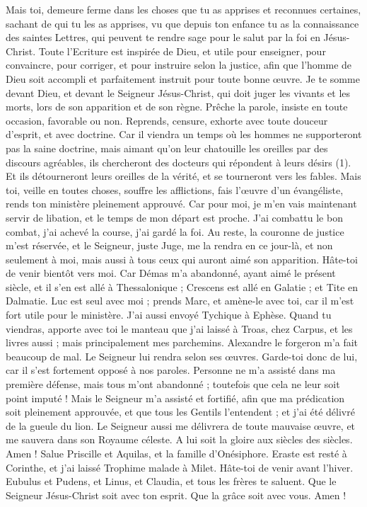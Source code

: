 \begin{multicols}{2}
Mais toi, demeure ferme dans les choses que tu as apprises et reconnues certaines, sachant de qui tu les as apprises,
vu que depuis ton enfance tu as la connaissance des saintes Lettres, qui peuvent te rendre sage pour le salut par la foi en Jésus-Christ.
Toute l'Ecriture est inspirée de Dieu, et utile pour enseigner, pour convaincre, pour corriger, et pour instruire selon la justice,
afin que l'homme de Dieu soit accompli et parfaitement instruit pour toute bonne œuvre.
\VerseOne{}Je te somme devant Dieu, et devant le Seigneur Jésus-Christ, qui doit juger les vivants et les morts, lors de son apparition et de son règne.
Prêche la parole, insiste en toute occasion, favorable ou non. Reprends, censure, exhorte avec toute douceur d'esprit, et avec doctrine.
Car il viendra un temps où les hommes ne supporteront pas la saine doctrine, mais aimant qu'on leur chatouille les oreilles par des discours agréables, ils chercheront des docteurs qui répondent à leurs désirs (1).
Et ils détourneront leurs oreilles de la vérité, et se tourneront vers les fables.
Mais toi, veille en toutes choses, souffre les afflictions, fais l'œuvre d'un évangéliste, rends ton ministère pleinement approuvé.
Car pour moi, je m'en vais maintenant servir de libation, et le temps de mon départ est proche.
J'ai combattu le bon combat, j'ai achevé la course, j'ai gardé la foi.
Au reste, la couronne de justice m'est réservée, et le Seigneur, juste Juge, me la rendra en ce jour-là, et non seulement à moi, mais aussi à tous ceux qui auront aimé son apparition.
Hâte-toi de venir bientôt vers moi.
Car Démas m'a abandonné, ayant aimé le présent siècle, et il s'en est allé à Thessalonique ; Crescens est allé en Galatie ; et Tite en Dalmatie.
Luc est seul avec moi ; prends Marc, et amène-le avec toi, car il m'est fort utile pour le ministère.
J'ai aussi envoyé Tychique à Ephèse.
Quand tu viendras, apporte avec toi le manteau que j'ai laissé à Troas, chez Carpus, et les livres aussi ; mais principalement mes parchemins.
Alexandre le forgeron m'a fait beaucoup de mal. Le Seigneur lui rendra selon ses œuvres.
Garde-toi donc de lui, car il s'est fortement opposé à nos paroles.
Personne ne m'a assisté dans ma première défense, mais tous m'ont abandonné ; toutefois que cela ne leur soit point imputé !
Mais le Seigneur m'a assisté et fortifié, afin que ma prédication soit pleinement approuvée, et que tous les Gentils l’entendent ; et j'ai été délivré de la gueule du lion.
Le Seigneur aussi me délivrera de toute mauvaise œuvre, et me sauvera dans son Royaume céleste. A lui soit la gloire aux siècles des siècles. Amen !
Salue Priscille et Aquilas, et la famille d'Onésiphore.
Eraste est resté à Corinthe, et j'ai laissé Trophime malade à Milet.
Hâte-toi de venir avant l'hiver. Eubulus et Pudens, et Linus, et Claudia, et tous les frères te saluent.
Que le Seigneur Jésus-Christ soit avec ton esprit. Que la grâce soit avec vous. Amen !
\PPE{}
\end{multicols}
